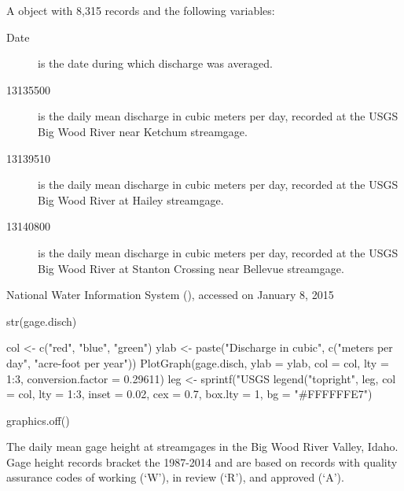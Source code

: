 \documentclass[a4paper]{book}
\begin{document}
\begin{Format}
A  object with 8,315 records and the following variables:
\begin{description}

\item[Date] is the date during which discharge was averaged.
\item[13135500] is the daily mean discharge in cubic meters per day, recorded at the USGS  Big Wood River near Ketchum streamgage.
\item[13139510] is the daily mean discharge in cubic meters per day, recorded at the USGS  Big Wood River at Hailey streamgage.
\item[13140800] is the daily mean discharge in cubic meters per day, recorded at the USGS  Big Wood River at Stanton Crossing near Bellevue streamgage.

\end{description}

\end{Format}
%
\begin{Source}\relax
National Water Information System (), accessed on January 8, 2015
\end{Source}
%
\begin{Examples}
\begin{ExampleCode}
str(gage.disch)

col <- c("red", "blue", "green")
ylab <- paste("Discharge in cubic", c("meters per day", "acre-foot per year"))
PlotGraph(gage.disch, ylab = ylab, col = col, lty = 1:3, conversion.factor = 0.29611)
leg <- sprintf("USGS %
legend("topright", leg, col = col, lty = 1:3, inset = 0.02, cex = 0.7,
       box.lty = 1, bg = "#FFFFFFE7")

graphics.off()
\end{ExampleCode}
\end{Examples}
%
\begin{Description}\relax
The daily mean gage height at streamgages in the Big Wood River Valley, Idaho.
Gage height records bracket the 1987-2014 and are based on records with quality assurance codes of working (`W'), in review (`R'), and approved (`A').

\end{Description}
\end{document}
